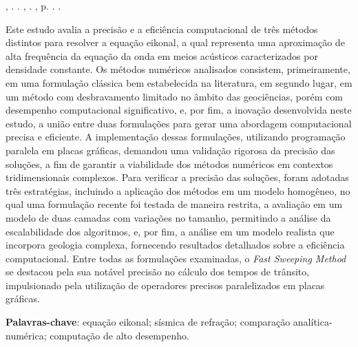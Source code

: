 \setlength{\absparsep}{18pt} %
\begin{resumo}
    \fonteResumo

	\begin{flushleft}
	\MakeUppercase{\imprimirSobrenome}, \imprimirPrimeirosNomes. \textbf{\imprimirtitulo}. \imprimirtipotrabalho, \imprimirinstituicao. \imprimirlocal,  p. \pageref{LastPage}. \imprimirAnoDeDefesa.
	\end{flushleft}
	
	Este estudo avalia a precisão e a eficiência computacional de três métodos distintos para resolver a equação eikonal, a qual representa uma aproximação de alta frequência da equação da onda em meios acústicos caracterizados por densidade constante. Os métodos numéricos analisados consistem, primeiramente, em uma formulação clássica bem estabelecida na literatura, em segundo lugar, em um método com desbravamento limitado no âmbito das geociências, porém com desempenho computacional significativo, e, por fim, a inovação desenvolvida neste estudo, a união entre duas formulações para gerar uma abordagem computacional precisa e eficiente. A implementação dessas formulações, utilizando programação paralela em placas gráficas, demandou uma validação rigorosa da precisão das soluções, a fim de garantir a viabilidade dos métodos numéricos em contextos tridimensionais complexos. Para verificar a precisão das soluções, foram adotadas três estratégias, incluindo a aplicação dos métodos em um modelo homogêneo, no qual uma formulação recente foi testada de maneira restrita, a avaliação em um modelo de duas camadas com variações no tamanho, permitindo a análise da escalabilidade dos algoritmos, e, por fim, a análise em um modelo realista que incorpora geologia complexa, fornecendo resultados detalhados sobre a eficiência computacional. Entre todas as formulações examinadas, o \textit{Fast Sweeping Method} se destacou pela sua notável precisão no cálculo dos tempos de trânsito, impulsionado pela utilização de operadores precisos paralelizados em placas gráficas.

    \textbf{Palavras-chave}: equação eikonal; sísmica de refração; comparação analítica-numérica; computação de alto desempenho.
\end{resumo}
